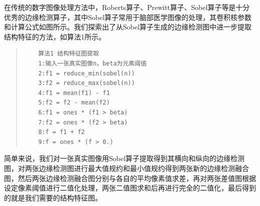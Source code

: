 \documentclass[letterpaper]{article} %
\begin{document}
在传统的数字图像处理方法中，Roberts算子\cite{87Roberts}、Prewitt算子\cite{88prewitt}、Sobel算子\cite{89Sobel}等是十分优秀的边缘检测算子，其中Sobel算子常用于脑部医学图像的处理，其卷积核参数和计算公式如图所示。我们探索出了从Sobel算子生成的边缘检测图中进一步提取结构特征的方法，如算法1所示。
\begin{quote}
	\begin{scriptsize}\begin{verbatim}
	算法1 结构特征图提取
	1:输入一张真实图像n，beta为元素阈值
	2:f1 = reduce_min(sobel(n))
	3:f2 = reduce_max(sobel(n))
	4:f1 = mean(f1) - f1
	5:f2 = f2 - mean(f2)
	6:f1 = ones * (f1 > beta)
	7:f2 = ones * (f2 > beta)
	8:f = f1 + f2
	9:f = ones * (f > 0.)
	\end{verbatim}\end{scriptsize}
\end{quote}
简单来说，我们对一张真实图像用Sobel算子提取得到其横向和纵向的边缘检测图，对两张边缘检测图进行最大值规约和最小值规约得到两张新的边缘检测融合图，然后两张边缘检测融合图分别与各自的平均像素值求差，再对两张差值图根据设定像素阈值进行二值化处理，两张二值图求和后再进行完全的二值化，最后得到的就是我们需要的结构特征图。
\end{document}
